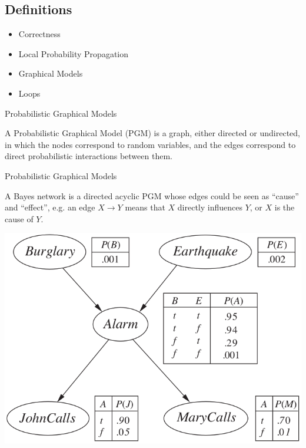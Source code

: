 \documentclass{beamer}
\begin{document}
\subsection{Definitions}
\begin{frame}
    \begin{itemize}
        \item Correctness
        \item Local Probability Propagation
        \item \alert<2>{Graphical Models}
        \item Loops
    \end{itemize}
\end{frame}
\begin{frame}{Probabilistic Graphical Models}
    \pause
    \begin{definition}
        A Probabilistic Graphical Model (PGM) is a graph, either directed or undirected, in which the nodes correspond to random variables,
        and the edges correspond to direct probabilistic interactions between them.
    \end{definition}
\end{frame}
\begin{frame}{Probabilistic Graphical Models}
    \pause
    \begin{definition}
        A Bayes network is a directed acyclic PGM whose edges could be seen as ``cause'' and ``effect'', e.g. an
        edge $ X \rightarrow Y $ means that $ X $ directly influences $ Y $, or $ X $ is the cause of $ Y $.
    \end{definition}
    \pause
    \begin{center}
        \includegraphics[scale=0.25]{bayesnet}
    \end{center}
\end{frame}
\end{document}
